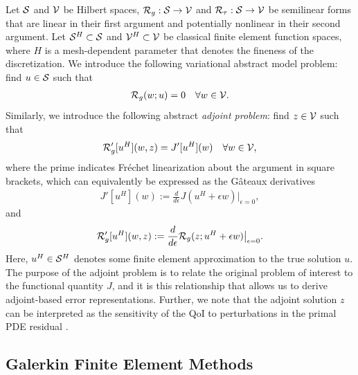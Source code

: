 Let $\S$ and $\V$ be Hilbert spaces, $\R_g : \S \to \V$ and
$\R_{\tau} : \S \to \V$ be semilinear forms that are linear in their first
argument and potentially nonlinear in their second argument. Let
$\S^H \subset \S$ and $\V^H \subset \V$ be classical finite element
function spaces, where $H$ is a mesh-dependent parameter that denotes the
fineness of the discretization. We introduce the following variational
abstract model problem: find $u \in \S$ such that
%
\begin{gather}
\R_g(w; u) = 0 \quad \forall w \in \V.
\label{eq:aut_abstract_primal}
\end{gather}
%
Similarly, we introduce the following abstract \emph{adjoint problem}:
find $z \in \V$ such that
%
\begin{gather}
\R_g'[u^H](w, z) = J'[u^H](w) \quad \forall w \in \V,
\label{eq:aut_abstract_adjoint}
\end{gather}
%
where the prime indicates Fr\'{e}chet linearization about the argument in
square brackets, which can equivalently be expressed as the G\^{a}teaux
derivatives
%
\begin{gather}
J'[u^H](w) :=
\frac{d}{d \epsilon} J(u^H + \epsilon w) \bigr|_{\epsilon = 0},
\end{gather}
%
and
%
\begin{gather}
\R_g'[u^H](w, z) :=
\frac{d}{d \epsilon} \R_g(z; u^H + \epsilon w) \bigr|_{\epsilon = 0}.
\end{gather}
%
Here, $u^H \in \S^H$ denotes some finite element approximation to the
true solution $u$. The purpose of the adjoint problem is to relate the
original problem of interest to the functional quantity $J$, and it is this
relationship that allows us to derive adjoint-based error representations.
Further, we note that the adjoint solution $z$ can be interpreted as
the sensitivity of the QoI to perturbations in the primal PDE residual
\cite{fidkowski2011review}.

\subsection{Galerkin Finite Element Methods}

